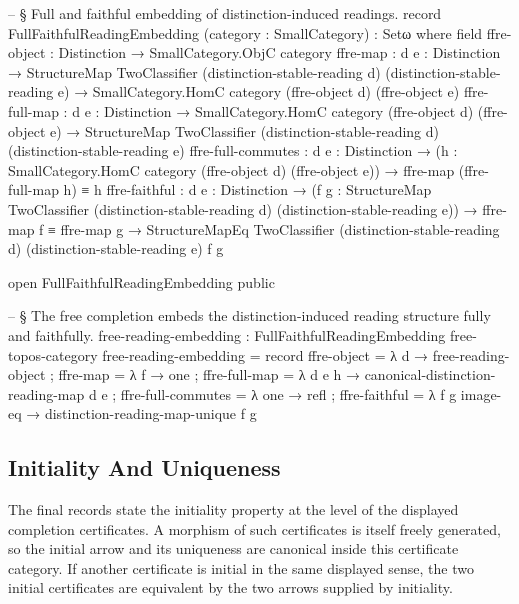 \documentclass[11pt]{article}
\begin{document}
\begin{code}

-- § Full and faithful embedding of distinction-induced readings.
record FullFaithfulReadingEmbedding (category : SmallCategory) : Setω where
  field
    ffre-object : Distinction → SmallCategory.ObjC category
    ffre-map    : {d e : Distinction} →
                  StructureMap TwoClassifier
                    (distinction-stable-reading d)
                    (distinction-stable-reading e) →
                  SmallCategory.HomC category (ffre-object d) (ffre-object e)
    ffre-full-map : {d e : Distinction} →
                    SmallCategory.HomC category (ffre-object d) (ffre-object e) →
                    StructureMap TwoClassifier
                      (distinction-stable-reading d)
                      (distinction-stable-reading e)
    ffre-full-commutes : {d e : Distinction} →
                         (h : SmallCategory.HomC category (ffre-object d) (ffre-object e)) →
                         ffre-map (ffre-full-map h) ≡ h
    ffre-faithful : {d e : Distinction} →
                    (f g : StructureMap TwoClassifier
                            (distinction-stable-reading d)
                            (distinction-stable-reading e)) →
                    ffre-map f ≡ ffre-map g →
                    StructureMapEq TwoClassifier
                      (distinction-stable-reading d)
                      (distinction-stable-reading e)
                      f g

open FullFaithfulReadingEmbedding public

-- § The free completion embeds the distinction-induced reading structure fully and faithfully.
free-reading-embedding : FullFaithfulReadingEmbedding free-topos-category
free-reading-embedding = record
  { ffre-object = λ d → free-reading-object
  ; ffre-map = λ f → one
  ; ffre-full-map = λ {d} {e} h → canonical-distinction-reading-map d e
  ; ffre-full-commutes = λ { one → refl }
  ; ffre-faithful = λ f g image-eq → distinction-reading-map-unique f g
  }
\end{code}

\subsection{Initiality And Uniqueness}

The final records state the initiality property at the level of the
displayed completion certificates.  A morphism of such certificates is
itself freely generated, so the initial arrow and its uniqueness are
canonical inside this certificate category.  If another certificate is
initial in the same displayed sense, the two initial certificates are
equivalent by the two arrows supplied by initiality.
\end{document}
